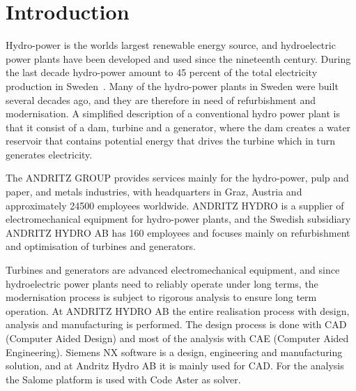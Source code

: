 
\section{Introduction}

Hydro-power is the worlds largest renewable energy source, and hydroelectric power plants have been developed and used since the nineteenth century. During the last decade hydro-power amount to 45 percent of the total electricity production in Sweden~\cite{scb}. Many of the hydro-power plants in Sweden were built several decades ago, and they are therefore in need of refurbishment and modernisation. A simplified description of a conventional hydro power plant is that it consist of a dam, turbine and a generator, where the dam creates a water reservoir that contains potential energy that drives the turbine which in turn generates electricity.

The ANDRITZ GROUP provides services mainly for the hydro-power, pulp and paper, and metals industries, with headquarters in Graz, Austria and approximately \num{24500} employees worldwide. ANDRITZ HYDRO is a supplier of electromechanical equipment for hydro-power plants, and the Swedish subsidiary ANDRITZ HYDRO AB has 160 employees and focuses mainly on refurbishment and optimisation of turbines and generators.

Turbines and generators are advanced electromechanical equipment, and since hydroelectric power plants need to reliably operate under long terms, the modernisation process is subject to rigorous analysis to ensure long term operation. At ANDRITZ HYDRO AB the entire realisation process with design, analysis and manufacturing is performed. 
The design process is done with CAD (Computer Aided Design) and most of the analysis with CAE (Computer Aided Engineering). Siemens NX software is a design, engineering and manufacturing solution, and at Andritz Hydro AB it is mainly used for CAD. For the analysis the Salome platform is used with Code Aster as solver.

